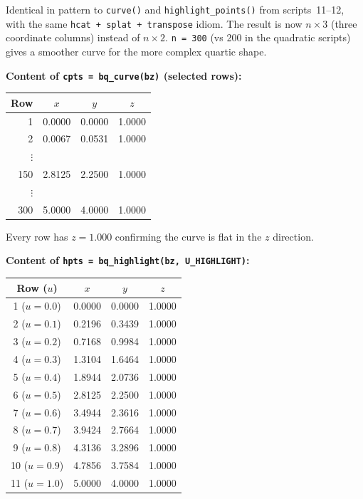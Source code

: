 \documentclass[12pt, a4paper]{article}
\newcommand{\cd}[1]{\texttt{#1}}
\begin{document}
Identical in pattern to \cd{curve()} and
\cd{highlight\_points()} from scripts~11--12,
with the same \cd{hcat + splat + transpose} idiom.
The result is now $n \times 3$ (three coordinate columns)
instead of $n \times 2$.
\cd{n = 300} (vs 200 in the quadratic scripts) gives a
smoother curve for the more complex quartic shape.

\begin{examplebox}
\textbf{Content of \cd{cpts = bq\_curve(bz)} (selected rows):}

\medskip
\begin{center}
\begin{tabular}{rccc}
\toprule
Row & $x$ & $y$ & $z$ \\
\midrule
1   & 0.0000 & 0.0000 & 1.0000 \\
2   & 0.0067 & 0.0531 & 1.0000 \\
$\vdots$ & & & \\
150 & 2.8125 & 2.2500 & 1.0000 \\
$\vdots$ & & & \\
300 & 5.0000 & 4.0000 & 1.0000 \\
\bottomrule
\end{tabular}
\end{center}

Every row has $z = 1.000$ confirming the curve is flat
in the $z$ direction.

\medskip
\textbf{Content of \cd{hpts = bq\_highlight(bz, U\_HIGHLIGHT)}:}

\medskip
\begin{center}
\begin{tabular}{cccc}
\toprule
Row ($u$) & $x$ & $y$ & $z$ \\
\midrule
1 ($u=0.0$) & 0.0000 & 0.0000 & 1.0000 \\
2 ($u=0.1$) & 0.2196 & 0.3439 & 1.0000 \\
3 ($u=0.2$) & 0.7168 & 0.9984 & 1.0000 \\
4 ($u=0.3$) & 1.3104 & 1.6464 & 1.0000 \\
5 ($u=0.4$) & 1.8944 & 2.0736 & 1.0000 \\
6 ($u=0.5$) & 2.8125 & 2.2500 & 1.0000 \\
7 ($u=0.6$) & 3.4944 & 2.3616 & 1.0000 \\
8 ($u=0.7$) & 3.9424 & 2.7664 & 1.0000 \\
9 ($u=0.8$) & 4.3136 & 3.2896 & 1.0000 \\
10 ($u=0.9$)& 4.7856 & 3.7584 & 1.0000 \\
11 ($u=1.0$)& 5.0000 & 4.0000 & 1.0000 \\
\bottomrule
\end{tabular}
\end{center}
\end{examplebox}
\end{document}
